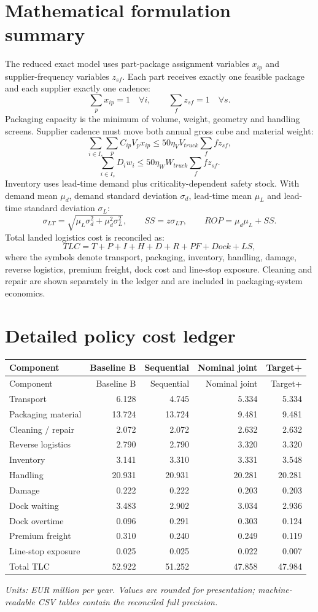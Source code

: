 \documentclass[11pt]{article}
\begin{document}
\section{Mathematical formulation summary}
The reduced exact model uses part-package assignment variables $x_{ip}$ and supplier-frequency variables $z_{sf}$. Each part receives exactly one feasible package and each supplier exactly one cadence:
\[
\sum_p x_{ip}=1 \quad \forall i, \qquad \sum_f z_{sf}=1 \quad \forall s.
\]
Packaging capacity is the minimum of volume, weight, geometry and handling screens. Supplier cadence must move both annual gross cube and material weight:
\[
\sum_{i\in I_s}\sum_p C_{ip}V_p x_{ip} \le 50\eta_V V_{truck}\sum_f f z_{sf},
\]
\[
\sum_{i\in I_s} D_iw_i \le 50\eta_W W_{truck}\sum_f f z_{sf}.
\]
Inventory uses lead-time demand plus criticality-dependent safety stock. With demand mean $\mu_d$, demand standard deviation $\sigma_d$, lead-time mean $\mu_L$ and lead-time standard deviation $\sigma_L$:
\[
\sigma_{LT}=\sqrt{\mu_L\sigma_d^2+\mu_d^2\sigma_L^2},\qquad SS=z\sigma_{LT},\qquad ROP=\mu_d\mu_L+SS.
\]
Total landed logistics cost is reconciled as:
\[
TLC=T+P+I+H+D+R+PF+Dock+LS,
\]
where the symbols denote transport, packaging, inventory, handling, damage, reverse logistics, premium freight, dock cost and line-stop exposure. Cleaning and repair are shown separately in the ledger and are included in packaging-system economics.

\section{Detailed policy cost ledger}
\begin{longtable}{lrrrr}
\toprule
Component & Baseline B & Sequential & Nominal joint & Target+ \\
\midrule
\endfirsthead
\toprule
Component & Baseline B & Sequential & Nominal joint & Target+ \\
\midrule
\endhead
Transport & 6.128 & 4.745 & 5.334 & 5.334 \\
Packaging material & 13.724 & 13.724 & 9.481 & 9.481 \\
Cleaning / repair & 2.072 & 2.072 & 2.632 & 2.632 \\
Reverse logistics & 2.790 & 2.790 & 3.320 & 3.320 \\
Inventory & 3.141 & 3.310 & 3.331 & 3.548 \\
Handling & 20.931 & 20.931 & 20.281 & 20.281 \\
Damage & 0.222 & 0.222 & 0.203 & 0.203 \\
Dock waiting & 3.483 & 2.902 & 3.034 & 2.936 \\
Dock overtime & 0.096 & 0.291 & 0.303 & 0.124 \\
Premium freight & 0.310 & 0.240 & 0.249 & 0.119 \\
Line-stop exposure & 0.025 & 0.025 & 0.022 & 0.007 \\
\midrule
Total TLC & 52.922 & 51.252 & 47.858 & 47.984 \\
\bottomrule
\end{longtable}
\textit{Units: EUR million per year. Values are rounded for presentation; machine-readable CSV tables contain the reconciled full precision.}
\end{document}

